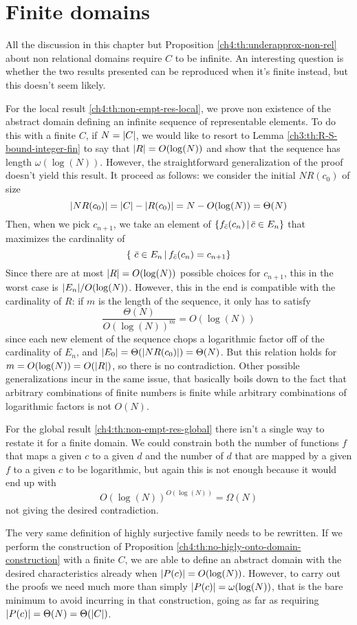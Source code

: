 \section{Finite domains}
All the discussion in this chapter but Proposition \ref{ch4:th:underapprox-non-rel} about non relational domains require $C$ to be infinite. An interesting question is whether the two results presented can be reproduced when it's finite instead, but this doesn't seem likely.

For the local result \ref{ch4:th:non-empt-res-local}, we prove non existence of the abstract domain defining an infinite sequence of representable elements. To do this with a finite $C$, if $N = \lvert C\rvert$, we would like to resort to Lemma \ref{ch3:th:R-S-bound-integer-fin} to say that $\lvert R\rvert = O(\log(N))$ and show that the sequence has length $\omega(\log(N))$. However, the straightforward generalization of the proof doesn't yield this result. It proceed as follows: we consider the initial $NR(c_0)$ of size
\[
\lvert NR(c_0)\rvert = \lvert C\rvert - \lvert R(c_0)\rvert = N - O(\log(N)) = \Theta(N)
\]
Then, when we pick $c_{n+1}$, we take an element of $\{ f_{\bar{c}}(c_n) \,\vert\, \bar{c} \in E_n \}$ that maximizes the cardinality of
\[
\{\ \bar{c} \in E_n \,\vert\, f_{\bar{c}}(c_n) = c_{n+1} \}
\]
Since there are at most $\lvert R\rvert = O(\log(N))$ possible choices for $c_{n+1}$, this in the worst case is $\lvert E_n\rvert / O(\log(N))$. However, this in the end is compatible with the cardinality of $R$: if $m$ is the length of the sequence, it only has to satisfy
\[
\frac{\Theta(N)}{O(\log(N))^m} = O(\log(N))
\]
since each new element of the sequence chops a logarithmic factor off of the cardinality of $E_n$, and $\lvert E_0\rvert = \Theta(\lvert NR(c_0)\rvert) = \Theta(N)$. But this relation holds for $m = O(\log(N)) = O(\lvert R\rvert)$, so there is no contradiction.
Other possible generalizations incur in the same issue, that basically boils down to the fact that arbitrary combinations of finite numbers is finite while arbitrary combinations of logarithmic factors is not $O(N)$.

For the global result \ref{ch4:th:non-empt-res-global} there isn't a single way to restate it for a finite domain. We could constrain both the number of functions $f$ that maps a given $c$ to a given $d$ and the number of $d$ that are mapped by a given $f$ to a given $c$ to be logarithmic, but again this is not enough because it would end up with
\[
O(\log(N))^{O(\log(N))} = \Omega(N)
\]
not giving the desired contradiction.

The very same definition of highly surjective family needs to be rewritten. If we perform the construction of Proposition \ref{ch4:th:no-higly-onto-domain-construction} with a finite $C$, we are able to define an abstract domain with the desired characteristics already when $\lvert P(c)\rvert = O(\log(N))$. However, to carry out the proofs we need much more than simply $\lvert P(c)\rvert = \omega(\log(N))$, that is the bare minimum to avoid incurring in that construction, going as far as requiring $\lvert P(c)\rvert = \Theta(N) = \Theta(\lvert C\rvert)$.

